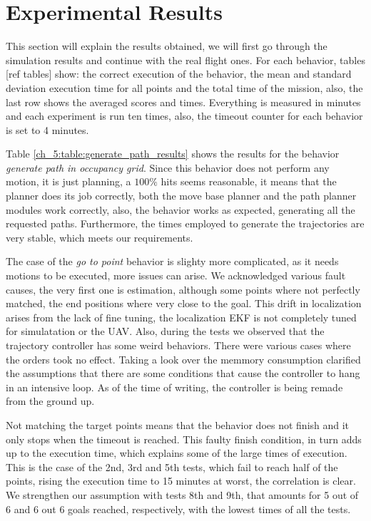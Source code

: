 \section{Experimental Results} \label{ch_5:sect:results}

  This section will explain the results obtained, we will first go through the simulation results and continue with the real flight ones. For each behavior, tables [ref tables] show: the correct execution of the behavior, the mean and standard deviation execution time for all points and the total time of the mission, also, the last row shows the averaged scores and times. Everything is measured in minutes and each experiment is run ten times, also, the timeout counter for each behavior is set to 4 minutes.
 
  

  Table \ref{ch_5:table:generate_path_results} shows the results for the behavior \textit{generate path in occupancy grid}. Since this behavior does not perform any motion, it is just planning, a $100\%$ hits seems reasonable, it means that the planner does its job correctly, both the move base planner and the path planner modules work correctly, also, the behavior works as expected, generating all the requested paths. Furthermore, the times employed to generate the trajectories are very stable, which meets our requirements. 

  

  The case of the \textit{go to point} behavior is slighty more complicated, as it needs motions to be executed, more issues can arise. We acknowledged various fault causes, the very first one is estimation, although some points where not perfectly matched, the end positions where very close to the goal. This drift in localization arises from the lack of fine tuning, the localization EKF is not completely tuned for simulatation or the UAV. Also, during the tests we observed that the trajectory controller has some weird behaviors. There were various cases where the orders took no effect. Taking a look over the memmory consumption clarified the assumptions that there are some conditions that cause the controller to hang in an intensive loop. As of the time of writing, the controller is being remade from the ground up.

  Not matching the target points means that the behavior does not finish and it only stops when the timeout is reached. This faulty finish condition, in turn adds up to the execution time, which explains some of the large times of execution. This is the case of the 2nd, 3rd and 5th tests, which fail to reach half of the points, rising the execution time to 15 minutes at worst, the correlation is clear. We strengthen our assumption with tests 8th and 9th, that amounts for 5 out of 6 and 6 out 6 goals reached, respectively, with the lowest times of all the tests.


